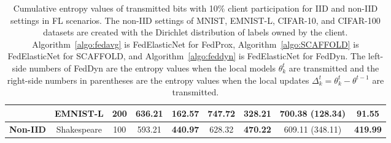 \documentclass{article} %
\begin{document}
\begin{table}[ht!]
{\begin{tabular}{|c|c|c|cc|cc|cc|}
& EMNIST-L  & 200 & 636.21  & \textbf{162.57} & 747.72  & \textbf{328.21}  & 700.38 (128.34)  & \textbf{91.55}  \\ \hline
\textbf{Non-IID} &   Shakespeare &   100 &   {593.21} &   \textbf{440.97} &   {628.32} &   \textbf{470.22} &   {609.11 (348.11)} & \textbf{419.99} \\ \hline
\end{tabular}%
}
\caption{Cumulative entropy values of transmitted bits with 10$\%$ client participation for IID and non-IID settings in FL scenarios. The non-IID settings of MNIST, EMNIST-L, CIFAR-10, and CIFAR-100 datasets are created with the Dirichlet distribution of labels owned by the client. Algorithm~\ref{algo:fedavg} is FedElasticNet for FedProx, Algorithm~\ref{algo:SCAFFOLD} is FedElasticNet for SCAFFOLD, and Algorithm~\ref{algo:feddyn} is FedElasticNet for FedDyn. The left-side numbers of FedDyn are the entropy values when the local models $\theta_k^t$ are transmitted and the right-side numbers in parentheses are the entropy values when the local updates $\Delta_k^t = \theta_k^t - \theta^{t-1}$ are transmitted.}
\label{tab:entropy}
\end{table}
\end{document}
